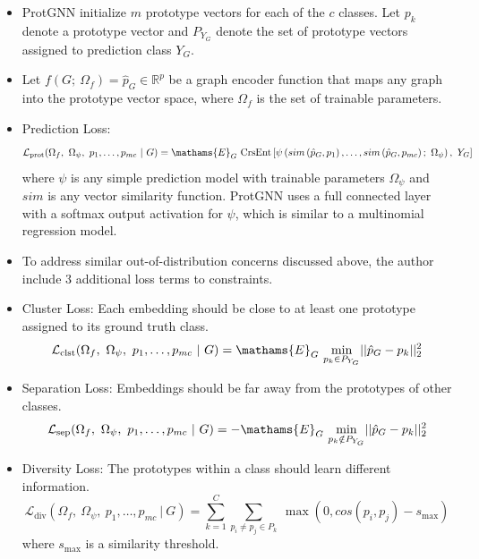 \documentclass[
  11pt,
  letterpaper,
]{article}
\begin{document}
\begin{itemize}
  \begin{itemize}
  \item
    ProtGNN initialize \(m\) prototype vectors for each of the \(c\)
    classes. Let \(p_k\) denote a prototype vector and \(P_{Y_G}\)
    denote the set of prototype vectors assigned to prediction class
    \(Y_G\).
  \item
    Let \(f(G; \ \Omega_f) = \hat p_G \in \mathbb{R}^p\) be a graph
    encoder function that maps any graph into the prototype vector
    space, where \(\Omega_f\) is the set of trainable parameters.
  \item
    Prediction Loss: \begin{equation}
          \mathcal{L}_{\text{prot}}(\Omega_f, \ \Omega_\psi, \ p_1, \dots, p_{mc} \ | \ G)= \mathams{E}_G \ \text{CrsEnt} \left[\psi \left(sim\left(\hat p_G, p_1\right), \dots, sim\left(\hat p_G, p_{mc}\right); \ \Omega_\psi\right), \ Y_G \right]
      \end{equation} where \(\psi\) is any simple prediction model with
    trainable parameters \(\Omega_\psi\) and \(sim\) is any vector
    similarity function. ProtGNN uses a full connected layer with a
    softmax output activation for \(\psi\), which is similar to a
    multinomial regression model.
  \item
    To address similar out-of-distribution concerns discussed above, the
    author include 3 additional loss terms to constraints.
  \item
    Cluster Loss: Each embedding should be close to at least one
    prototype assigned to its ground truth class.\\
    \begin{equation}
          \mathcal{L}_{\text{clst}}(\Omega_f, \ \Omega_\psi, \ p_1, \dots, p_{mc} \ | \ G) = \mathams{E}_G \ \underset{p_k \in P_{Y_G}}{\text{min}} || \hat p_G - p_k ||^2_2
      \end{equation}
  \item
    Separation Loss: Embeddings should be far away from the prototypes
    of other classes. \begin{equation}
          \mathcal{L}_{\text{sep}}(\Omega_f, \ \Omega_\psi, \ p_1, \dots, p_{mc} \ | \ G) = - \mathams{E}_G \ \underset{p_k \notin P_{Y_G}}{\text{min}} || \hat p_G - p_k ||^2_2
      \end{equation}
  \item
    Diversity Loss: The prototypes within a class should learn different
    information.\\
    \begin{equation}
           \mathcal{L}_{\text{div}}(\Omega_f, \ \Omega_\psi, \ p_1, \dots, p_{mc} \ | \ G) = \sum_{k=1}^C \sum_{p_i \neq p_j \in P_k} \ \max(0, cos(p_i, p_j) - s_\text{max})
      \end{equation} where \(s_\text{max}\) is a similarity threshold.
  \end{itemize}
\end{itemize}
\end{document}

